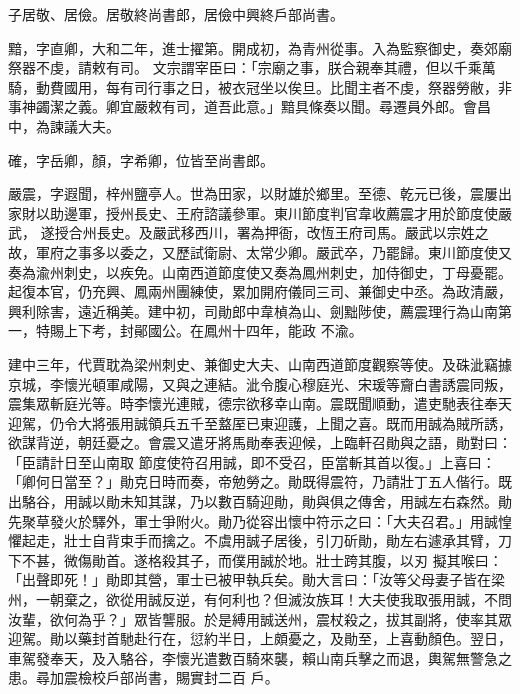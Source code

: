 \begin{pinyinscope}
 子居敬、居儉。居敬終尚書郎，居儉中興終戶部尚書。



 黯，字直卿，大和二年，進士擢第。開成初，為青州從事。入為監察御史，奏郊廟祭器不虔，請敕有司。
 文宗謂宰臣曰：「宗廟之事，朕合親奉其禮，但以千乘萬騎，動費國用，每有司行事之日，被衣冠坐以俟旦。比聞主者不虔，祭器勞敝，非事神蠲潔之義。卿宜嚴敕有司，道吾此意。」黯具條奏以聞。尋遷員外郎。會昌中，為諫議大夫。



 確，字岳卿，顏，字希卿，位皆至尚書郎。



 嚴震，字遐聞，梓州鹽亭人。世為田家，以財雄於鄉里。至德、乾元已後，震屢出家財以助邊軍，授州長史、王府諮議參軍。東川節度判官韋收薦震才用於節度使嚴武，
 遂授合州長史。及嚴武移西川，署為押衙，改恆王府司馬。嚴武以宗姓之故，軍府之事多以委之，又歷試衛尉、太常少卿。嚴武卒，乃罷歸。東川節度使又奏為渝州刺史，以疾免。山南西道節度使又奏為鳳州刺史，加侍御史，丁母憂罷。起復本官，仍充興、鳳兩州團練使，累加開府儀同三司、兼御史中丞。為政清嚴，興利除害，遠近稱美。建中初，司勛郎中韋楨為山、劍黜陟使，薦震理行為山南第一，特賜上下考，封鄖國公。在鳳州十四年，能政
 不渝。



 建中三年，代賈耽為梁州刺史、兼御史大夫、山南西道節度觀察等使。及硃泚竊據京城，李懷光頓軍咸陽，又與之連結。泚令腹心穆庭光、宋瑗等齎白書誘震同叛，震集眾斬庭光等。時李懷光連賊，德宗欲移幸山南。震既聞順動，遣吏馳表往奉天迎駕，仍令大將張用誠領兵五千至盩厔已東迎護，上聞之喜。既而用誠為賊所誘，欲謀背逆，朝廷憂之。會震又遣牙將馬勛奉表迎候，上臨軒召勛與之語，勛對曰：「臣請計日至山南取
 節度使符召用誠，即不受召，臣當斬其首以復。」上喜曰：「卿何日當至？」勛克日時而奏，帝勉勞之。勛既得震符，乃請壯丁五人偕行。既出駱谷，用誠以勛未知其謀，乃以數百騎迎勛，勛與俱之傳舍，用誠左右森然。勛先聚草發火於驛外，軍士爭附火。勛乃從容出懷中符示之曰：「大夫召君。」用誠惶懼起走，壯士自背束手而擒之。不虞用誠子居後，引刀斫勛，勛左右遽承其臂，刀下不甚，微傷勛首。遂格殺其子，而僕用誠於地。壯士跨其腹，以刃
 擬其喉曰：「出聲即死！」勛即其營，軍士已被甲執兵矣。勛大言曰：「汝等父母妻子皆在梁州，一朝棄之，欲從用誠反逆，有何利也？但滅汝族耳！大夫使我取張用誠，不問汝輩，欲何為乎？」眾皆讋服。於是縛用誠送州，震杖殺之，拔其副將，使率其眾迎駕。勛以藥封首馳赴行在，愆約半日，上頗憂之，及勛至，上喜動顏色。翌日，車駕發奉天，及入駱谷，李懷光遣數百騎來襲，賴山南兵擊之而退，輿駕無警急之患。尋加震檢校戶部尚書，賜實封二百
 戶。




\end{pinyinscope}
